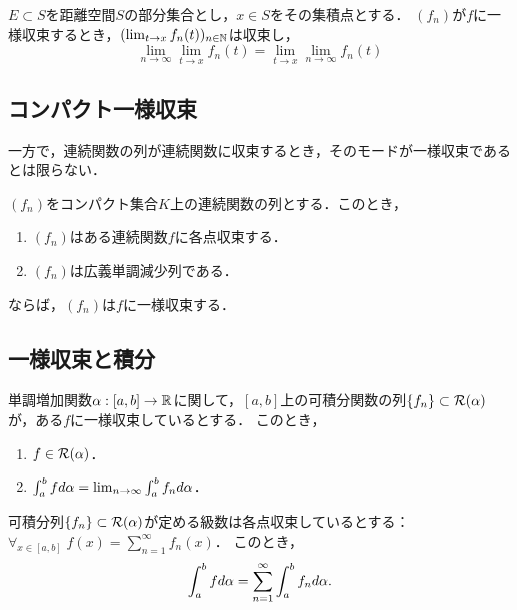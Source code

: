 \documentclass[uplatex, dvipdfmx]{jsreport}
\begin{document}
\begin{theorem}
    $E\subset S$を距離空間$S$の部分集合とし，$x\in S$をその集積点とする．
    $(f_n)$が$f$に一様収束するとき，$(\lim_{t\to x}f_n(t))_{n\in\mathbb{N}}$は収束し，
    \[\lim_{n\to\infty}\lim_{t\to x}f_n(t)=\lim_{t\to x}\lim_{n\to\infty}f_n(t)\]
\end{theorem}

\subsection{コンパクト一様収束}

\begin{tcolorbox}[colframe=ForestGreen, colback=ForestGreen!10!white,breakable,colbacktitle=ForestGreen!40!white,coltitle=black,fonttitle=\bfseries\sffamily,
title=]
    一方で，連続関数の列が連続関数に収束するとき，そのモードが一様収束であるとは限らない．
\end{tcolorbox}

\begin{theorem}
    $(f_n)$をコンパクト集合$K$上の連続関数の列とする．このとき，
    \begin{enumerate}
        \item $(f_n)$はある連続関数$f$に各点収束する．
        \item $(f_n)$は広義単調減少列である．
    \end{enumerate}
    ならば，$(f_n)$は$f$に一様収束する．
\end{theorem}

\subsection{一様収束と積分}

\begin{theorem}
    単調増加関数$\alpha:[a,b]\to\mathbb{R}$に関して，$[a,b]$上の可積分関数の列$\{f_n\}\subset\mathcal{R}(\alpha)$が，ある$f$に一様収束しているとする．
    このとき，
    \begin{enumerate}
        \item $f\in\mathcal{R}(\alpha)$．
        \item $\int^b_afd\alpha=\lim_{n\to\infty}\int^b_af_nd\alpha$．
    \end{enumerate}
\end{theorem}

\begin{corollary}[項別積分]
    可積分列$\{f_n\}\subset\mathcal{R}(\alpha)$が定める級数は各点収束しているとする：$\forall_{x\in[a,b]}\;f(x)=\sum^\infty_{n=1}f_n(x)$．
    このとき，
    \[\int^b_afd\alpha=\sum^\infty_{n=1}\int^b_af_nd\alpha.\]
\end{corollary}
\end{document}
